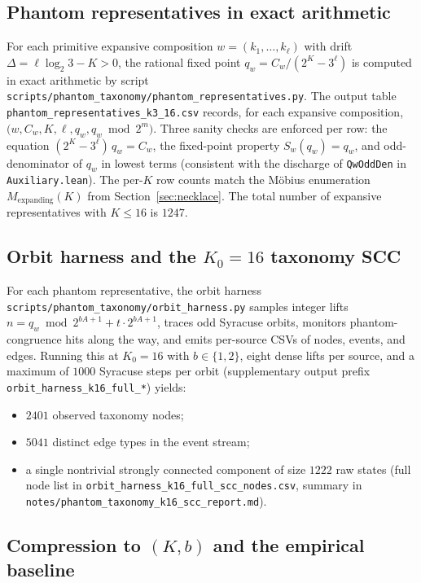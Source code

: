 \documentclass[11pt,a4paper]{article}
\theoremstyle{definition}
\begin{document}
\subsection{Phantom representatives in exact arithmetic}
\label{sec:representatives}

For each primitive expansive composition
$w = (k_1, \ldots, k_\ell)$ with drift
$\Delta = \ell \log_2 3 - K > 0$, the rational fixed point
$q_w = C_w / (2^K - 3^\ell)$ is computed in exact arithmetic by
script
\verb|scripts/phantom_taxonomy/phantom_representatives.py|. The
output table
\verb|phantom_representatives_k3_16.csv|
records, for each expansive composition,
$\bigl(w, C_w, K, \ell, q_w, q_w \bmod 2^m\bigr)$.
Three sanity checks are enforced per row: the equation
$(2^K - 3^\ell)\, q_w = C_w$, the fixed-point property
$S_w(q_w) = q_w$, and odd-denominator of $q_w$ in lowest terms
(consistent with the discharge of \texttt{QwOddDen} in
\texttt{Auxiliary.lean}). The per-$K$ row counts match the
M\"obius enumeration $M_{\mathrm{expanding}}(K)$ from
Section~\ref{sec:necklace}. The total number of expansive
representatives with $K \le 16$ is $1247$.

\subsection{Orbit harness and the $K_0 = 16$ taxonomy SCC}
\label{sec:harness}

For each phantom representative, the orbit harness
\verb|scripts/phantom_taxonomy/orbit_harness.py| samples integer
lifts $n = q_w \bmod 2^{bA + 1} + t \cdot 2^{bA + 1}$, traces odd
Syracuse orbits, monitors phantom-congruence hits along the way,
and emits per-source CSVs of nodes, events, and edges. Running
this at $K_0 = 16$ with $b \in \{1, 2\}$, eight dense lifts per
source, and a maximum of $1000$ Syracuse steps per orbit
(supplementary output prefix
\verb|orbit_harness_k16_full_*|) yields:
\begin{itemize}
  \item $2401$ observed taxonomy nodes;
  \item $5041$ distinct edge types in the event stream;
  \item a single nontrivial strongly connected component of size
        $1222$ raw states (full node list in
        \verb|orbit_harness_k16_full_scc_nodes.csv|, summary in
        \verb|notes/phantom_taxonomy_k16_scc_report.md|).
\end{itemize}

\subsection{Compression to $(K, b)$ and the empirical baseline}
\label{sec:empirical-baseline}
\end{document}
